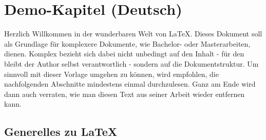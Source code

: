 %
%
%
\chapter{Demo-Kapitel (Deutsch)}
%
Herzlich Willkommen in der wunderbaren Welt von \LaTeX{}.
Dieses Dokument soll als Grundlage für komplexere Dokumente, wie Bachelor-
oder Masterarbeiten, dienen.
Komplex bezieht sich dabei nicht unbedingt auf den Inhalt - für den bleibt
der Author selbst verantwortlich - sondern auf die Dokumentstruktur.
Um sinnvoll mit dieser Vorlage umgehen zu können, wird empfohlen, die
nachfolgenden Abschnitte mindestens einmal durchzulesen.
Ganz am Ende wird dann auch verraten, wie man diesen Text aus seiner
Arbeit wieder entfernen kann.
%
\section{Generelles zu \LaTeX{}}
%
